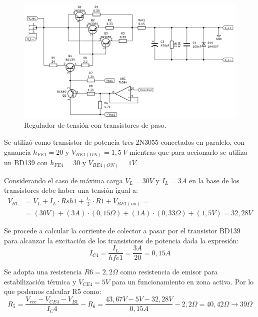 \begin{figure} [H]
	\centering
	\includegraphics[width=\textwidth]{./imagenes/Circuito_actuador.png}
	\caption{Regulador de tensión con transistores de paso.}
	\label{F:Circuito_Actuador}
\end{figure} \par 

Se utilizó como transistor de potencia tres 2N3055 conectados en paralelo, con ganancia $h_{FE1} =20$ y $V_{BE1(ON)} =1,5~V$ mientras que para accionarlo se utiliza un BD139 con $h_{FE4} =30$ y $V_{BE4(ON)} =1V$. \par 
Considerando el caso de máxima carga $V_L =30V$ y $I_L =3A$ en la base de los transistores debe haber una tensión igual a:
\begin{equation}
\begin{split}
V_{B1}&=V_L+I_L\cdot Rsh1+\frac{I_L}{3}\cdot R1+V_{BE1(on)}= \\
&=(30V)+(3A)\cdot (0,15\Omega)+(1A)\cdot (0,33\Omega)+(1,5V)=32,28V
\end{split}
\end{equation} \par 

Se procede a calcular la corriente de colector a pasar por el transistor BD139 para alcanzar la excitación de los transistores de potencia dada la expresión:
\begin{equation}
I_{C4}=\frac{I_L}{hfe1}=\frac{3A}{20}=0,15A
\end{equation} \par 

Se adopta una resistencia $R6=2,2\Omega$ como resistencia de emisor para estabilización térmica y $V_{CE4}=5V$ para un funcionamiento en zona activa. Por lo que podemos calcular R5 como:
\begin{equation}
R_5=\frac{V_{rec}-V_{CE4}-V_{B1}}{I_C4}-R_6=\frac{43,67 V-5V-32,28V}{0,15A}-2,2\Omega=40,42\Omega \to 39\Omega 
\end{equation} \par 

